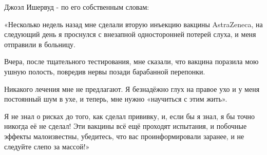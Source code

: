 Джоэл Ишервуд - по его собственным словам:

«Несколько недель назад мне сделали вторую инъекцию вакцины AstraZeneca, на
следующий день я проснулся с внезапной односторонней потерей слуха, и меня
отправили в больницу.

Вчера, после тщательного тестирования, мне сказали, что вакцина поразила мою
ушную полость, повредив нервы позади барабанной перепонки.

Никакого лечения мне не предлагают. Я безнадёжно глух на правое ухо и у меня
постоянный шум в ухе, и теперь, мне нужно «научиться с этим жить».

Я не знал о рисках до того, как сделал прививку, и, если бы я знал, я бы точно
никогда её не сделал! Эти вакцины всё ещё проходят испытания, и побочные эффекты
малоизвестны, убедитесь, что вас проинформировали заранее, и не следуйте слепо
за массой!»
